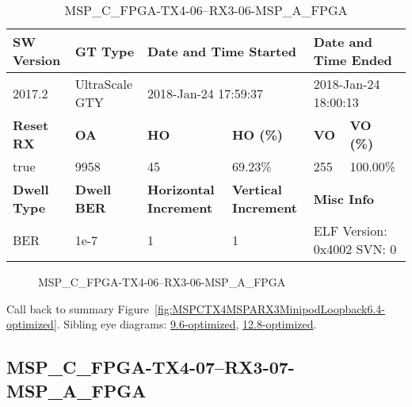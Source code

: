 \begin{table}[h]
\centering
\caption{MSP\_C\_FPGA-TX4-06--RX3-06-MSP\_A\_FPGA}
\label{tab:MSPCFPGATX406RX306MSPAFPGA6.4-optimized}
\begin{tabular}{@{}|l|l|l|l|l|l|@{}}
\toprule
\textbf{SW Version}                & \textbf{GT Type}   & \multicolumn{2}{l|}{\textbf{Date and Time Started}}            & \multicolumn{2}{l|}{\textbf{Date and Time Ended}}        \\ \midrule
2017.2                       & UltraScale GTY          & \multicolumn{2}{l|}{2018-Jan-24 17:59:37}                   & \multicolumn{2}{l|}{2018-Jan-24 18:00:13}               \\ \midrule
\textbf{Reset RX}                  & \textbf{OA} & \textbf{HO}   & \textbf{HO (\%)} & \textbf{VO} & \textbf{VO (\%)} \\ \midrule
true & 9958        & 45          & 69.23\%        & 255        & 100.00\%       \\ \midrule
\textbf{Dwell Type}                & \textbf{Dwell BER} & \textbf{Horizontal Increment} & \textbf{Vertical Increment}    & \multicolumn{2}{l|}{\textbf{Misc Info}}                  \\ \midrule
BER                            & 1e-7        & 1        & 1           & \multicolumn{2}{l|}{ELF Version: 0x4002 SVN: 0}                         \\ \bottomrule
\end{tabular}
\end{table}

\begin{figure}[h]
\caption{MSP\_C\_FPGA-TX4-06--RX3-06-MSP\_A\_FPGA} \label{fig:MSPCFPGATX406RX306MSPAFPGA6.4-optimized}
\end{figure}

Call back to summary Figure~\ref{fig:MSPCTX4MSPARX3MinipodLoopback6.4-optimized}.
Sibling eye diagrams: \hyperref[sec:MSPCFPGATX406RX306MSPAFPGA9.6-optimized]{9.6-optimized}, \hyperref[sec:MSPCFPGATX406RX306MSPAFPGA12.8-optimized]{12.8-optimized}.

\clearpage
\newpage


\subsection{MSP\_C\_FPGA-TX4-07--RX3-07-MSP\_A\_FPGA}\label{sec:MSPCFPGATX407RX307MSPAFPGA6.4-optimized}

